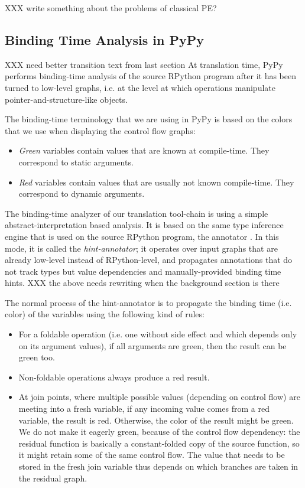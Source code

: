 XXX write something about the problems of classical PE?

\subsection{Binding Time Analysis in PyPy}

XXX need better transition text from last section
At translation time, PyPy performs binding-time analysis of the source
RPython program after it has been turned to low-level graphs, i.e. at
the level at which operations manipulate pointer-and-structure-like
objects.

The binding-time terminology that we are using in PyPy is based on the
colors that we use when displaying the control flow graphs:

\begin{itemize}
\item \emph{Green} variables contain values that are known at compile-time.
They correspond to static arguments.
\item \emph{Red} variables contain values that are usually not known
compile-time. They correspond to dynamic arguments.
\end{itemize}

The binding-time analyzer of our translation tool-chain is using a simple
abstract-interpretation based analysis. It is based on the
same type inference engine that is used on the source RPython program,
the annotator .  In this mode, it is called the \emph{hint-annotator}; it
operates over input graphs that are already low-level instead of
RPython-level, and propagates annotations that do not track types but
value dependencies and manually-provided binding time hints.
XXX the above needs rewriting when the background section is there

The normal process of the hint-annotator is to propagate the binding
time (i.e. color) of the variables using the following kind of rules:

\begin{itemize}
\item For a foldable operation (i.e. one without side effect and which depends
only on its argument values), if all arguments are green, then the result can
be green too.

\item Non-foldable operations always produce a red result.

\item At join points, where multiple possible values (depending on control
flow) are meeting into a fresh variable, if any incoming value comes from a red
variable, the result is red.  Otherwise, the color of the result might be
green.  We do not make it eagerly green, because of the control flow
dependency: the residual function is basically a constant-folded copy of the
source function, so it might retain some of the same control flow.  The value
that needs to be stored in the fresh join variable thus depends on which
branches are taken in the residual graph.
\end{itemize}

